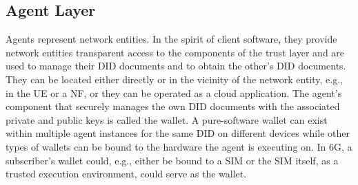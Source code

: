 \documentclass[conference]{IEEEtran}
\begin{document}




\subsection{Agent Layer}
\label{agent_layer}

Agents represent network entities. In the spirit of client software, they provide network entities transparent access to the components of the trust layer and are used to manage their DID documents and to obtain the other's DID documents. They can be located either directly or in the vicinity of the network entity, e.g., in the UE or a NF, or they can be operated as a cloud application. The agent's component that securely manages the own DID documents with the associated private and public keys is called the wallet. A pure-software wallet can exist within multiple agent instances for the same DID on different devices while other types of wallets can be bound to the hardware the agent is executing on. In 6G, a subscriber's wallet could, e.g., either be bound to a SIM or the SIM itself, as a trusted execution environment, could serve as the wallet. 
\end{document}
